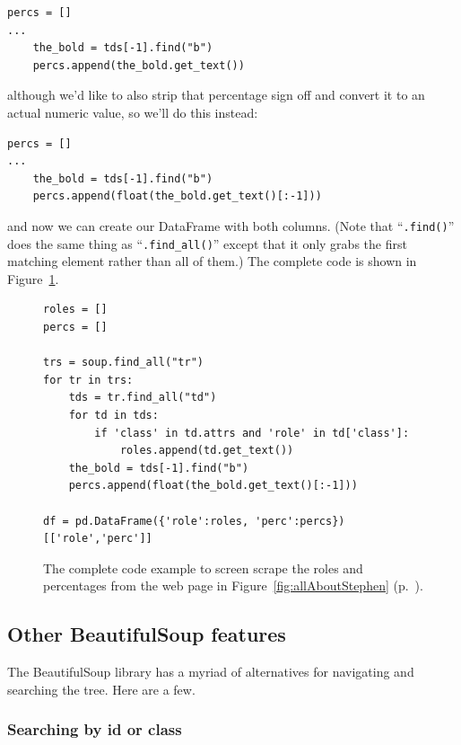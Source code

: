 \begin{Verbatim}[fontsize=\small,samepage=true,frame=single,framesep=3mm]
percs = []
...
    the_bold = tds[-1].find("b")
    percs.append(the_bold.get_text())
\end{Verbatim}

although we'd like to also strip that percentage sign off and convert it to an
actual numeric value, so we'll do this instead:

\begin{Verbatim}[fontsize=\small,samepage=true,frame=single,framesep=3mm]
percs = []
...
    the_bold = tds[-1].find("b")
    percs.append(float(the_bold.get_text()[:-1]))
\end{Verbatim}


and now we can create our DataFrame with both columns. (Note that
``\texttt{.find()}'' does the same thing as ``\texttt{.find\_all()}'' except
that it only grabs the first matching element rather than all of them.) The
complete code is shown in Figure~\ref{fig:getRolesComplete}.

\begin{figure}[ht]
\begin{Verbatim}[fontsize=\footnotesize,samepage=true,frame=single,framesep=3mm]
roles = []
percs = []

trs = soup.find_all("tr")
for tr in trs:
    tds = tr.find_all("td")
    for td in tds:
        if 'class' in td.attrs and 'role' in td['class']:
            roles.append(td.get_text())
    the_bold = tds[-1].find("b")
    percs.append(float(the_bold.get_text()[:-1]))

df = pd.DataFrame({'role':roles, 'perc':percs})[['role','perc']]
\end{Verbatim}
\caption{The complete code example to screen scrape the roles and percentages
from the web page in Figure~\ref{fig:allAboutStephen}
(p.~\pageref{fig:allAboutStephen}).}
\label{fig:getRolesComplete}
\end{figure}

\subsection{Other BeautifulSoup features}

The BeautifulSoup library has a myriad of alternatives for navigating and
searching the tree. Here are a few.

\subsubsection{Searching by id or class}

